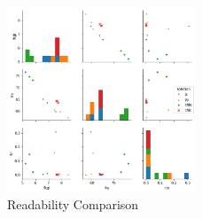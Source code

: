 \documentclass[conference]{IEEEtran}
\begin{document}
\begin{figure}
  \centering
	\includegraphics[width=0.5\textwidth]
		{benchmark/readability.png}
	\caption{Readability Comparison}
	\label{fig:readabilityComparison}
\end{figure}
\end{document}
